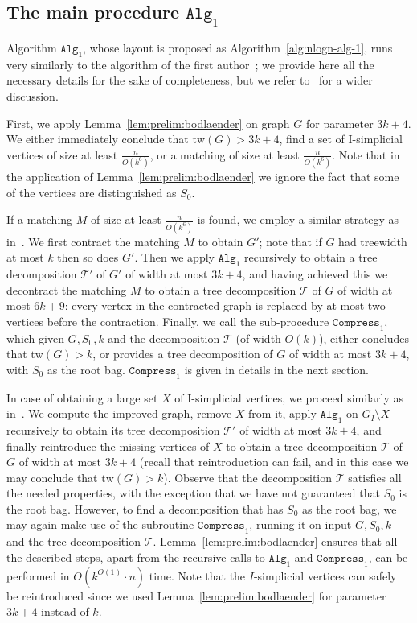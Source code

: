 \documentclass[a4paper,11pt]{article}
\theoremstyle{definition}
\theoremstyle{remark}
\newcommand{\compress}[1]{\mathtt{Compress}_{#1}}
\newcommand{\alg}[1]{\mathtt{Alg}_{#1}}
\newcommand{\td}{\mathcal{T}} \newcommand{\tw}{\mathrm{tw}} \newcommand{\w}{\mathrm{w}}
\begin{document}
\subsection{The main procedure $\alg{1}$}

Algorithm $\alg{1}$, whose layout is proposed as
Algorithm~\ref{alg:nlogn-alg-1}, runs very similarly to the algorithm
of the first author~\cite{Bodlaender96}; we provide here all the
necessary details for the sake of completeness, but we refer
to~\cite{Bodlaender96} for a wider discussion.

First, we apply Lemma~\ref{lem:prelim:bodlaender} on graph $G$ for
parameter $3k+4$.  We either immediately conclude that $\tw(G)>3k+4$,
find a set of I-simplicial vertices of size at least
$\frac{n}{O(k^6)}$, or a matching of size at least $\frac{n}{O(k^6)}$.
Note that in the application of Lemma~\ref{lem:prelim:bodlaender} we
ignore the fact that some of the vertices are distinguished as $S_0$.

If a matching $M$ of size at least $\frac{n}{O(k^6)}$ is found, we
employ a similar strategy as in~\cite{Bodlaender96}.  We first
contract the matching $M$ to obtain $G'$; note that if $G$ had
treewidth at most $k$ then so does $G'$.  Then we apply $\alg{1}$
recursively to obtain a tree decomposition $\td'$ of $G'$ of width at
most $3k+4$, and having achieved this we decontract the matching $M$
to obtain a tree decomposition $\td$ of $G$ of width at most $6k+9$:
every vertex in the contracted graph is replaced by at most two
vertices before the contraction.  Finally, we call the sub-procedure
$\compress{1}$, which given $G,S_0,k$ and the decomposition $\td$ (of
width $O(k)$), either concludes that $\tw(G)>k$, or provides a tree
decomposition of $G$ of width at most $3k+4$, with $S_0$ as the root
bag.  $\compress{1}$ is given in details in the next section.

In case of obtaining a large set $X$ of I-simplicial vertices, we
proceed similarly as in~\cite{Bodlaender96}.  We compute the improved
graph, remove $X$ from it, apply $\alg{1}$ on $G_I\setminus X$
recursively to obtain its tree decomposition $\td'$ of width at most
$3k+4$, and finally reintroduce the missing vertices of $X$ to obtain
a tree decomposition $\td$ of $G$ of width at most $3k+4$ (recall that
reintroduction can fail, and in this case we may conclude that
$\tw(G)>k$).  Observe that the decomposition $\td$ satisfies all the
needed properties, with the exception that we have not guaranteed that
$S_0$ is the root bag.  However, to find a decomposition that has
$S_0$ as the root bag, we may again make use of the subroutine
$\compress{1}$, running it on input $G, S_0, k$ and the tree
decomposition $\td$.  Lemma~\ref{lem:prelim:bodlaender} ensures that
all the described steps, apart from the recursive calls to $\alg{1}$
and $\compress{1}$, can be performed in $O(k^{O(1)}\cdot n)$ time.
Note that the $I$-simplicial vertices can safely be reintroduced since
we used Lemma~\ref{lem:prelim:bodlaender} for parameter $3k+4$ instead
of $k$.
\end{document}
